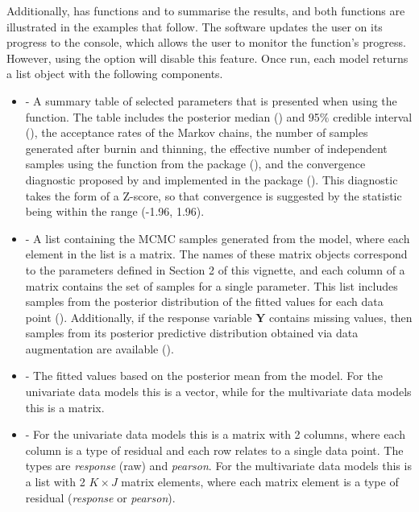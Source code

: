 \documentclass[article,shortnames,nojss]{jss}
\begin{document}
Additionally,  has functions  and  to summarise the results, and both functions are illustrated in the examples that follow. The software updates the user on its progress to the  console, which allows the user to monitor the function's progress. However, using the  option will disable this feature. Once run, each model returns a list object with the following components. 


\begin{itemize}
\item {} - A summary table of selected parameters that is presented when using the  function. The table includes the posterior median () and 95$\%$ credible interval (), the acceptance rates of the Markov chains, the number of samples generated after burnin and thinning, the effective number of independent samples using the   function from the  package (), and the convergence  diagnostic proposed by \cite{geweke1992} and implemented in the  package (). This diagnostic takes the form of a Z-score, so that convergence is suggested by the statistic being within the range (-1.96, 1.96).

\item {} - A list containing the MCMC samples generated from the model, where each element in the list is a matrix. The names of these matrix objects correspond to the parameters defined in Section 2 of this vignette, and each column of a matrix contains the set of samples for a single parameter. This list includes samples from the posterior distribution of the fitted values for each data point (). Additionally, if the response variable $\mathbf{Y}$ contains missing values, then samples from its posterior predictive distribution obtained via data augmentation are available ().

\item {} - The fitted values based on the posterior mean from the model. For the univariate data models this is a vector, while for the multivariate data models this is a matrix.

\item {} - For the univariate data models this is a matrix with 2 columns, where each column is a type of residual and each row relates to a single data point. The types are \emph{response} (raw) and \emph{pearson}. For the multivariate data models this is a list with 2 $K\times J$ matrix elements, where each matrix element is a type of residual (\emph{response} or \emph{pearson}). 


\end{itemize}
\end{document}
